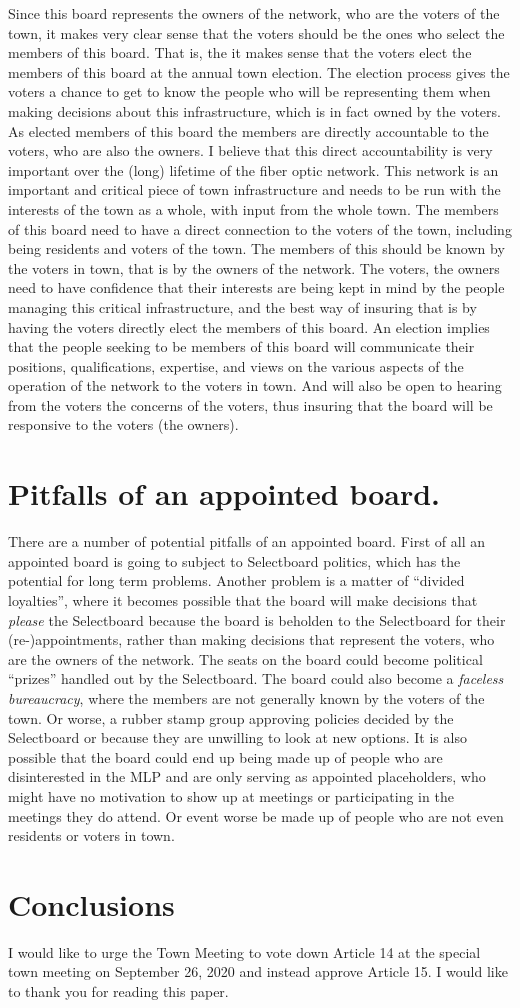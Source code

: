 \documentclass[12pt]{article}
\begin{document}
Since this board represents the owners of the network, who are the voters of 
the town, it makes very clear sense that the voters should be the ones who 
select the members of this board.  That is, the it makes sense that the voters 
elect the members of this board at the annual town election.  The election 
process gives the voters a chance to get to know the people who will be 
representing them when making decisions about this infrastructure, which is in 
fact owned by the voters.  As elected members of this board the members are 
directly accountable to the voters, who are also the owners. I believe that 
this direct accountability is very important over the (long) lifetime of the 
fiber optic network.  This network is an important and critical piece of town 
infrastructure and needs to be run with the interests of the town as a whole, 
with input from the whole town.  The members of this board need to have a 
direct connection to the voters of the town, including being residents and 
voters of the town. The members of this should be known by the voters in town, 
that is by the owners of the network.  The voters, the owners need to have 
confidence that their interests are being kept in mind by the people managing 
this critical infrastructure, and the best way of insuring that is by having 
the voters directly elect the members of this board.  An election implies that 
the people seeking to be members of this board will communicate their 
positions, qualifications, expertise, and views on the various aspects of the 
operation of the network to the voters in town.  And will also be open to 
hearing from the voters the concerns of the voters, thus insuring that the 
board will be responsive to the voters (the owners). 

\section{Pitfalls of an appointed board.}

There are a number of potential pitfalls of an appointed board. First of all
an appointed board is going to subject to Selectboard politics, which has the
potential for long term problems. Another problem is a matter of ``divided
loyalties'', where it becomes possible that the board will make decisions that
\textit{please} the Selectboard because the board is beholden to the
Selectboard for their (re-)appointments, rather than making decisions that
represent the voters, who are the owners of the network. The seats on the
board could become political ``prizes'' handled out by the Selectboard. The
board could also become a \textit{faceless bureaucracy}, where the members are
not generally known by the voters of the town. Or worse, a rubber stamp group
approving policies decided by the Selectboard or because they are unwilling to
look at new options. It is also possible that the board could end up being
made up of people who are disinterested in the MLP and are only serving as
appointed placeholders, who might have no motivation to show up at meetings or
participating in the meetings they do attend. Or event worse be made up of
people who are not even residents or voters in town.

\section{Conclusions}

I would like to urge the Town Meeting to vote down Article 14 at the special
town meeting on September 26, 2020 and instead approve Article 15. I would
like to thank you for reading this paper.
\end{document}

